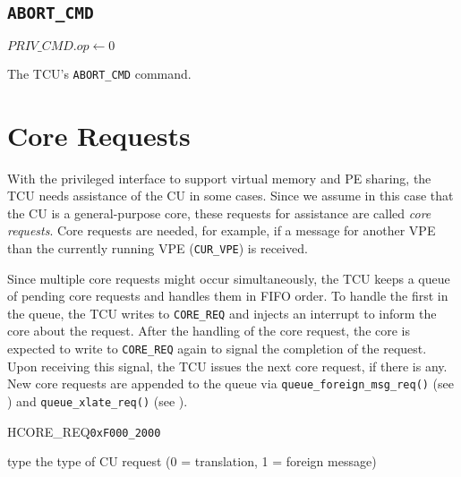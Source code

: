 \subsection{\texttt{ABORT\_CMD}}

\begin{algorithm}[H]
    \BlankLine
    $PRIV\_CMD.op \gets 0$\;
    \caption{The TCU's \texttt{ABORT\_CMD} command.}
\end{algorithm}
\extend{}

\section{Core Requests}

With the privileged interface to support virtual memory and PE sharing, the TCU needs assistance of
the CU in some cases. Since we assume in this case that the CU is a general-purpose core, these
requests for assistance are called \emph{core requests}. Core requests are needed, for example, if a
message for another VPE than the currently running VPE (\texttt{CUR\_VPE}) is received.

Since multiple core requests might occur simultaneously, the TCU keeps a queue of pending core
requests and handles them in FIFO order. To handle the first in the queue, the TCU writes to
\texttt{CORE\_REQ} and injects an interrupt to inform the core about the request. After the handling
of the core request, the core is expected to write to \texttt{CORE\_REQ} again to signal the
completion of the request. Upon receiving this signal, the TCU issues the next core request, if
there is any. New core requests are appended to the queue via \texttt{queue\_foreign\_msg\_req()}
(see ) and \texttt{queue\_xlate\_req()} (see ).

\begin{register}{H}{CORE\_REQ}{\texttt{0xF000\_2000}}
  \regnewline%
  \begin{regdesc}\begin{reglist}
    \item[type] the type of CU request (0 = translation, 1 = foreign message)
  \end{reglist}\end{regdesc}
\end{register}

